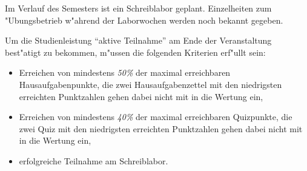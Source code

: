 \documentclass[a4,11pt]{article}
\begin{document}
Im Verlauf des Semesters ist ein Schreiblabor geplant. Einzelheiten
zum "Ubungsbetrieb w"ahrend der Laborwochen werden noch bekannt gegeben.





\smallskip

Um die Studienleistung "`aktive Teilnahme"' am Ende der Veranstaltung
best"atigt zu bekommen, m"ussen die folgenden Kriterien erf"ullt sein:
\begin{itemize}
\itemsep0pt
\item Erreichen von mindestens {\em 50\%} der maximal
erreichbaren Hausaufgabenpunkte, die zwei Hausaufgabenzettel mit 
den niedrigsten erreichten Punktzahlen gehen dabei nicht mit in die
Wertung ein,
\item Erreichen von mindestens {\em 40\%} der maximal
erreichbaren Quizpunkte, die zwei Quiz mit 
den niedrigsten erreichten Punktzahlen gehen dabei nicht mit in die
Wertung ein,
\item erfolgreiche Teilnahme am Schreiblabor.
\end{itemize}
\bigskip

%

%
%
\end{document}
